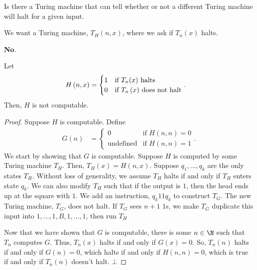 \documentclass[10pt]{mypackage}
\begin{document}
\begin{question}
  Is there a Turing machine that can tell whether or not a different Turing machine will halt for a given input.
\end{question}
We want a Turing machine, $T_{H}\left(n,x\right)$, where we ask if $T_{n}(x)$ halts.
\begin{answer}
  \textbf{No}.
\end{answer}
\begin{theorem}
  Let
  \begin{align*}
    H\left(n,x\right) &= \begin{cases}
      1 & \text{if $T_{n}(x)$ halts}\\
      0 & $\text{if $T_{n}\left(x\right)$ does not halt}$
    \end{cases}.
  \end{align*}
  Then, $H$ is not computable.
\end{theorem}
\begin{proof}
  Suppose $H$ is computable. Define
  \begin{align*}
    G\left(n\right) &= \begin{cases}
      0 & \text{if $H\left(n,n\right) = 0$}\\
      \text{undefined} & \text{if $H\left(n,n\right) = 1$}
    \end{cases}.
  \end{align*}
  We start by showing that $G$ is computable. Suppose $H$ is computed by some Turing machine $T_{H}$. Then, $T_{H}(x) = H\left(n,x\right)$. Suppose $q_1,\dots,q_{k}$ are the only states $T_{H}$. Without loss of generality, we assume $T_{H}$ halts if and only if $T_{H}$ enters state $q_{k}$. We can also modify $T_{H}$ such that if the output is $1$, then the head ends up at the square with $1$. We add an instruction, $q_{k}11q_{k}$ to construct $T_{G}$. The new Turing machine, $T_{G}$, does not halt. If $T_{G}$ sees $n+1$ $1$s, we make $T_{G}$ duplicate this input into $1,\dots,1,B,1,\dots,1$, then run $T_{H}$\newline

  Now that we have shown that $G$ is computable, there is some $n\in \N$ such that $T_n$ computes $G$. Thus, $T_n(x)$ halts if and only if $G(x) = 0$. So, $T_{n}(n)$ halts if and only if $G(n) = 0$, which halts if and only if $H(n,n) = 0$, which is true if and only if $T_{n}(n)$ doesn't halt. $\bot$
\end{proof}
\end{document}

